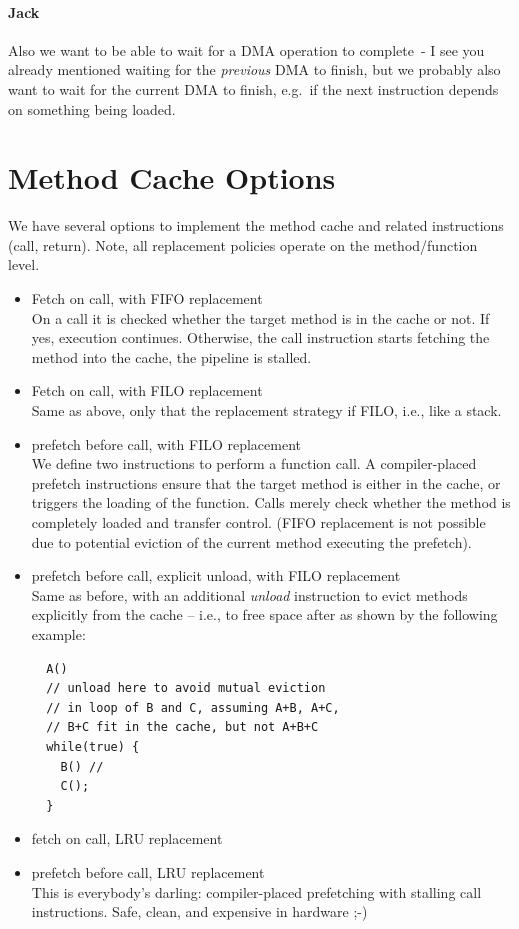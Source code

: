 \documentclass{IEEEtran}
\newcommand{\comment}[3]{\paragraph*{\textbf{#1}}{\color{#3}#2}}
\newcommand{\jack}[1]{\comment{Jack}{#1}{Magenta}}
\begin{document}
\jack{Also we want to be able to wait for a DMA operation to complete~- I
see you already mentioned waiting for the {\it previous} DMA to finish,
but we probably also want to wait for the current DMA to finish,
e.g.~if the next instruction depends on something being loaded.}

\section{Method Cache Options}
\label{sec:method_cache_options}

We have several options to implement the method cache and related instructions
(call, return). Note, all replacement policies operate on the method/function
level.
\begin{itemize}
  \item Fetch on call, with FIFO replacement \\
        On a call it is checked whether the target method is in the cache or
        not. If yes, execution continues. Otherwise, the call instruction
        starts fetching the method into the cache, the pipeline is stalled.
  \item Fetch on call, with FILO replacement \\
        Same as above, only that the replacement strategy if FILO, i.e., like a
        stack.
  \item prefetch before call, with FILO replacement \\
        We define two instructions to perform a function call. A compiler-placed
        prefetch instructions ensure that the target method is either in the
        cache, or triggers the loading of the function. Calls merely check
        whether the method is completely loaded and transfer control.
        (FIFO replacement is not possible due to potential eviction of the
        current method executing the prefetch).
  \item prefetch before call, explicit unload, with FILO replacement \\
        Same as before, with an additional \emph{unload} instruction to evict
        methods explicitly from the cache -- i.e., to free space after as shown
        by the following example:
\begin{verbatim}
  A()
  // unload here to avoid mutual eviction
  // in loop of B and C, assuming A+B, A+C,
  // B+C fit in the cache, but not A+B+C
  while(true) {
    B() //
    C();
  }
\end{verbatim}
  \item fetch on call, LRU replacement \\
  \item prefetch before call, LRU replacement \\
        This is everybody's darling: compiler-placed prefetching with stalling
        call instructions. Safe, clean, and expensive in hardware ;-)
\end{itemize}
\end{document}
